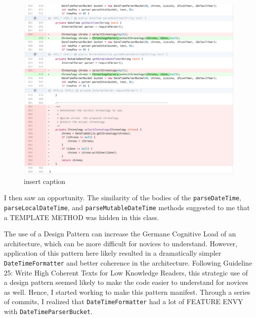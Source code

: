 \begin{figure}[H]
	\centering
	\includegraphics[width=\linewidth]{code44}
	\caption{insert caption}
\end{figure}
I then saw an opportunity. The similarity of the bodies of the \texttt{parseDateTime},  \texttt{parseLocalDateTime}, and \texttt{parseMutableDateTime} methods suggested to me that a TEMPLATE METHOD was hidden in this class. 

The use of a Design Pattern can increase the Germane Cognitive Load of an architecture, which can be more difficult for novices to understand. However, application of this pattern here likely resulted in a dramatically simpler \texttt{DateTimeFormatter} and better coherence in the architecture. Following Guideline 25: Write High Coherent Texts for Low Knowledge Readers, this strategic use of a design pattern seemed likely to make the code easier to understand for novices as well. Hence, I started working to make this pattern manifest. Through a series of commits, I realized that \texttt{DateTimeFormatter} had a lot of FEATURE ENVY with \texttt{DateTimeParserBucket}.

